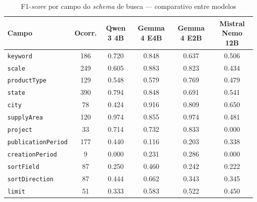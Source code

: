 \begin{table}[htbp!]
\centering
\caption{F1-\textit{score} por campo do \textit{schema} de busca --- comparativo entre modelos}
\label{tab:resultados_por_campo}
\small
\begin{tabular}{|l|c|c|c|c|c|}
\hline
\textbf{Campo} & \textbf{Ocorr.} & \textbf{Qwen 3 4B} & \textbf{Gemma 4 E4B} & \textbf{Gemma 4 E2B} & \textbf{Mistral Nemo 12B} \\
\hline
\texttt{keyword} & 186 & 0.720 & 0.848 & 0.637 & 0.506 \\
\texttt{scale} & 249 & 0.605 & 0.883 & 0.823 & 0.434 \\
\texttt{productType} & 129 & 0.548 & 0.579 & 0.769 & 0.479 \\
\texttt{state} & 390 & 0.794 & 0.848 & 0.691 & 0.541 \\
\texttt{city} & 78 & 0.424 & 0.916 & 0.809 & 0.650 \\
\texttt{supplyArea} & 120 & 0.974 & 0.855 & 0.974 & 0.481 \\
\texttt{project} & 33 & 0.714 & 0.732 & 0.833 & 0.000 \\
\texttt{publicationPeriod} & 177 & 0.440 & 0.116 & 0.203 & 0.338 \\
\texttt{creationPeriod} & 9 & 0.000 & 0.231 & 0.286 & 0.000 \\
\texttt{sortField} & 87 & 0.250 & 0.460 & 0.242 & 0.222 \\
\texttt{sortDirection} & 87 & 0.444 & 0.662 & 0.343 & 0.345 \\
\texttt{limit} & 51 & 0.333 & 0.583 & 0.522 & 0.450 \\
\hline
\end{tabular}
\end{table}

